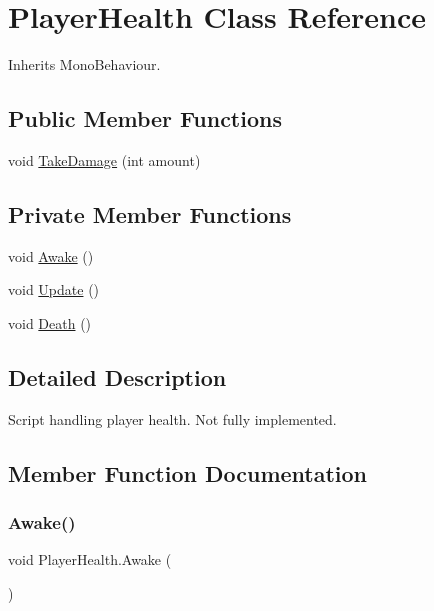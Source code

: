 \hypertarget{class_player_health}{}\section{Player\+Health Class Reference}
\label{class_player_health}


Inherits Mono\+Behaviour.

\subsection*{Public Member Functions}
\begin{DoxyCompactItemize}
\item 
void \hyperlink{class_player_health_a93c7a5b0a1baade297356b1f3341daf5}{Take\+Damage} (int amount)
\end{DoxyCompactItemize}
\subsection*{Private Member Functions}
\begin{DoxyCompactItemize}
\item 
void \hyperlink{class_player_health_a5de7909cbaba3f4da83878ed56e995d0}{Awake} ()
\item 
void \hyperlink{class_player_health_a3c49fdd702b2cf0fca654ef6e502f311}{Update} ()
\item 
void \hyperlink{class_player_health_a0a4b5c4a0184cbe9b8a5af76764cf343}{Death} ()
\end{DoxyCompactItemize}


\subsection{Detailed Description}
Script handling player health. Not fully implemented. 



\subsection{Member Function Documentation}
\mbox{\label{class_player_health_a5de7909cbaba3f4da83878ed56e995d0}} 
\subsubsection{\texorpdfstring{Awake()}{Awake()}}
{\footnotesize\ttfamily void Player\+Health.\+Awake (\begin{DoxyParamCaption}{ }\end{DoxyParamCaption})\hspace{0.3cm}{\ttfamily [private]}}



